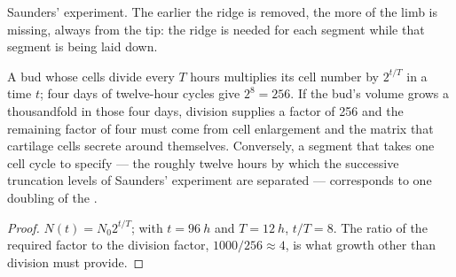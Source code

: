 \begin{omfigure}

{\small Saunders' experiment. The earlier the ridge is removed, the
more of the limb is missing, always from the tip: the ridge is
needed for each segment while that segment is being laid down.}
\end{omfigure}

\begin{theorem}\label{thm:b2:limb-organogenesis:growth}
A bud whose cells divide every $T$ hours multiplies its cell number
by $2^{t/T}$ in a time $t$; four days of twelve-hour cycles give
$2^{8} = 256$. If the bud's volume grows a thousandfold in those
four days, division supplies a factor of 256 and the remaining
factor of four must come from cell enlargement and the matrix
that cartilage cells secrete around themselves. Conversely, a
segment that takes one cell cycle to specify --- the roughly twelve
hours by which the successive truncation levels of Saunders'
experiment are separated --- corresponds to one doubling of the
.
\end{theorem}
\begin{proof}
$N(t) = N_0 2^{t/T}$; with $t = \qty{96}{h}$ and $T = \qty{12}{h}$,
$t/T = 8$. The ratio of the required factor to the division factor,
$1000/256 \approx 4$, is what growth other than division must
provide.
\end{proof}

